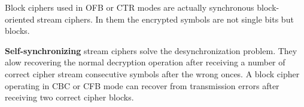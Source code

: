 Block ciphers used in OFB or CTR modes are actually synchronous block-oriented stream ciphers.
In them the encrypted symbols are not single bits but blocks.

\textbf{Self-synchronizing} stream ciphers solve the desynchronization problem.
They alow recovering the normal decryption operation after receiving a number of correct cipher stream consecutive symbols after the wrong onces.
A block cipher operating in CBC or CFB mode can recover from transmission errors after receiving two correct cipher blocks.
